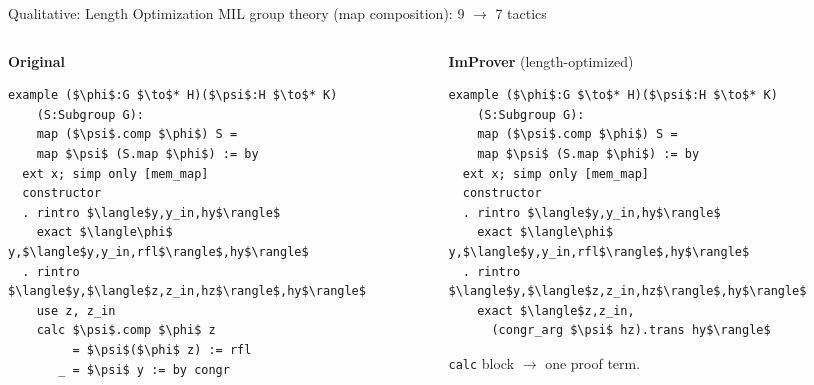 \documentclass{beamer}
\begin{document}
\begin{frame}[fragile]{Qualitative: Length Optimization}
\vspace{0.3em}
{\small MIL group theory (map composition): 9 $\to$ 7 tactics}
\begin{columns}[T]
\begin{column}{0.49\textwidth}
\textbf{Original}
\begin{lstlisting}[basicstyle=\scriptsize\ttfamily]
example ($\phi$:G $\to$* H)($\psi$:H $\to$* K)
    (S:Subgroup G):
    map ($\psi$.comp $\phi$) S =
    map $\psi$ (S.map $\phi$) := by
  ext x; simp only [mem_map]
  constructor
  . rintro $\langle$y,y_in,hy$\rangle$
    exact $\langle\phi$ y,$\langle$y,y_in,rfl$\rangle$,hy$\rangle$
  . rintro $\langle$y,$\langle$z,z_in,hz$\rangle$,hy$\rangle$
    use z, z_in
    calc $\psi$.comp $\phi$ z
         = $\psi$($\phi$ z) := rfl
       _ = $\psi$ y := by congr
\end{lstlisting}
\end{column}
\begin{column}{0.49\textwidth}
\textbf{ImProver} (length-optimized)
\begin{lstlisting}[basicstyle=\scriptsize\ttfamily]
example ($\phi$:G $\to$* H)($\psi$:H $\to$* K)
    (S:Subgroup G):
    map ($\psi$.comp $\phi$) S =
    map $\psi$ (S.map $\phi$) := by
  ext x; simp only [mem_map]
  constructor
  . rintro $\langle$y,y_in,hy$\rangle$
    exact $\langle\phi$ y,$\langle$y,y_in,rfl$\rangle$,hy$\rangle$
  . rintro $\langle$y,$\langle$z,z_in,hz$\rangle$,hy$\rangle$
    exact $\langle$z,z_in,
      (congr_arg $\psi$ hz).trans hy$\rangle$
\end{lstlisting}
\vspace{0.3em}
\small \texttt{calc} block $\to$ one proof term.
\end{column}
\end{columns}
\end{frame}
\end{document}
